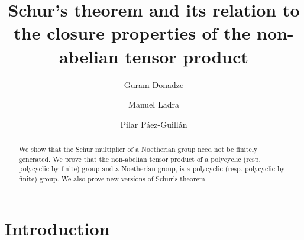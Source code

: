 \documentclass[12pt,reqno]{amsart}
\theoremstyle{definition}
\numberwithin{equation}{section}
\theoremstyle{definition}
\begin{document}
\title[Schur's theorem and its relation with the non-abelian tensor product]{Schur's theorem and its relation to the closure properties of the non-abelian tensor product}


\author[G.~Donadze]{Guram Donadze }
\address{[G.~Donadze] Departamento de Matematica, Universidade de Brasilia, Brasilia-DF,
	70910-900 Brazil and Vladimir Chavchanidze Institute of Cybernetics of
	the Georgian Technical University, Sandro Euli str. 5, Tbilisi 0186,
	Georgia}
	
	\author[M. Ladra]{Manuel Ladra }
	\address{[M. Ladra] Department of Matem\'aticas, University of Santiago de Compostela, 15782 Santiago de Compostela, Spain}
	
\author[P. P\'aez-Guill\'an]{Pilar P\'aez-Guill\'an }
	\address{[P. P\'aez-Guill\'an] Department of Matem\'aticas, University of Santiago de Compostela, 15782 Santiago de Compostela, Spain}



\begin{abstract} We show that the Schur multiplier of a Noetherian group need not be finitely generated.
We prove that the non-abelian tensor product of a polycyclic (resp. polycyclic-by-finite) group
and a Noetherian group, is a polycyclic (resp. polycyclic-by-finite) group. We also prove new versions of Schur's theorem.

\end{abstract}



\maketitle

\section{Introduction}\label{Intr}
\end{document}
